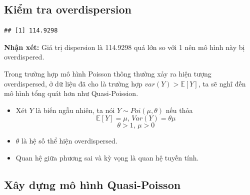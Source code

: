 \documentclass[
  11pt,
  letterpaper,
]{article}
\begin{document}
\subsection{Kiểm tra overdispersion}

\begin{verbatim}
## [1] 114.9298
\end{verbatim}

\textbf{Nhận xét:} Giá trị dispersion là 114.9298 quá lớn so với 1 nên mô hình này bị overdispered.

Trong trường hợp mô hình Poisson thông thường xảy ra hiện tượng overdispersed, ở dữ liệu đã cho là trường hợp \(var(Y) > \mathbb{E}[Y]\), ta sẽ nghĩ đến mô hình tổng quát hơn như Quasi-Poission.

\begin{itemize}
\item  Xét $Y$ là biến ngẫu nhiên, ta nói $Y \sim Poi(\mu, \theta)$ nếu thỏa 
$$\mathbb{E}[Y]= \mu \text{, } Var(Y) = \theta \mu $$
 $$\theta > 1 \text{, } \mu > 0$$ 
\item $\theta$ là hệ số thể hiện overdispersed. 
\item Quan hệ giữa phương sai và kỳ vọng là quan hệ tuyến tính.
\end{itemize}

\subsection{Xây dựng mô hình Quasi-Poisson}
\end{document}
